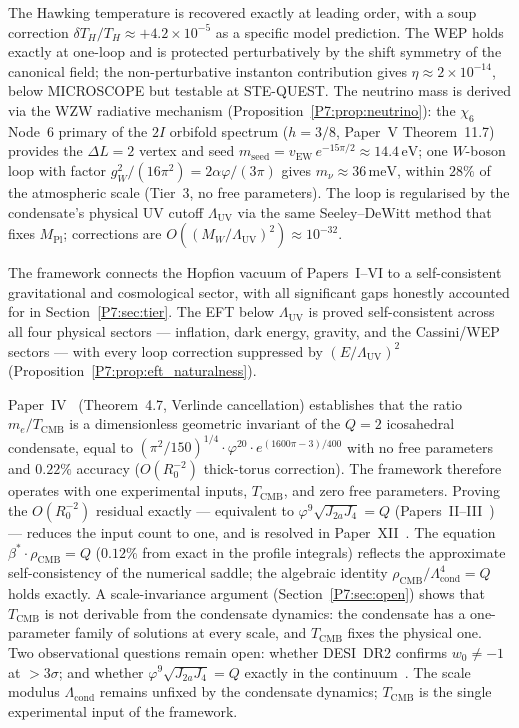 \documentclass[11pt,a4paper]{article}
\theoremstyle{definition}
\theoremstyle{remark}
\newcommand{\vp}{\varphi}
\newcommand{\bst}{\beta^{*}}
\newcommand{\TCMB}{T_{\mathrm{CMB}}}
\newcommand{\rCMB}{\rho_{\mathrm{CMB}}}
\newcommand{\Lcond}{\Lambda_{\mathrm{cond}}}
\newcommand{\vEW}{v_{\mathrm{EW}}}
\newcommand{\MPl}{M_{\mathrm{Pl}}}
\newcommand{\LUV}{\Lambda_{\mathrm{UV}}}
\newcommand{\Ja}{J_{2a}}
\newcommand{\Jfour}{J_{4}}
\begin{document}
The Hawking temperature is recovered exactly at leading order, with
a soup correction $\delta T_H/T_H\approx+4.2\times10^{-5}$ as a
specific model prediction.  The WEP holds exactly at one-loop and is
protected perturbatively by the shift symmetry of the canonical field;
the non-perturbative instanton contribution gives $\eta\approx2\times10^{-14}$,
below MICROSCOPE but testable at STE-QUEST.
The neutrino mass is derived via the WZW radiative mechanism
(Proposition~\ref{P7:prop:neutrino}): the $\chi_6$ Node~6 primary
of the $2I$ orbifold spectrum ($h=3/8$, Paper~V Theorem~11.7)
provides the $\Delta L=2$ vertex and seed
$m_\mathrm{seed}=\vEW\,e^{-15\pi/2}\approx14.4\,\mathrm{eV}$;
one $W$-boson loop with factor $g_W^2/(16\pi^2)=2\alpha\vp/(3\pi)$
gives $m_\nu\approx36\,\mathrm{meV}$, within $28\%$ of the atmospheric
scale (Tier~3, no free parameters).
The loop is regularised by the condensate's physical UV cutoff $\LUV$
via the same Seeley--DeWitt method that fixes $\MPl$; corrections
are $O((M_W/\LUV)^2)\approx10^{-32}$.

The framework connects the Hopfion vacuum of Papers~I--VI to a
self-consistent gravitational and cosmological sector, with all
significant gaps honestly accounted for in Section~\ref{P7:sec:tier}.
The EFT below $\LUV$ is proved self-consistent across all four physical
sectors --- inflation, dark energy, gravity, and the Cassini/WEP
sectors --- with every loop correction suppressed by $(E/\LUV)^2$
(Proposition~\ref{P7:prop:eft_naturalness}).

Paper~IV~\cite{Paper4} (Theorem~4.7, Verlinde cancellation) establishes
that the ratio $m_e/\TCMB$ is a dimensionless geometric invariant of the
$Q=2$ icosahedral condensate, equal to
$(\pi^2/150)^{1/4}\cdot\vp^{20}\cdot e^{(1600\pi-3)/400}$
with no free parameters and $0.22\%$ accuracy ($O(R_0^{-2})$ thick-torus correction).
The framework therefore operates with one experimental inputs,
$\TCMB$, and zero free parameters.
Proving the $O(R_0^{-2})$ residual exactly --- equivalent to
$\vp^9\sqrt{\Ja\Jfour}=Q$ (Papers~II--III~\cite{Paper2,Paper3}) --- reduces the input count to one, and is resolved in Paper~XII~\cite{Paper12}.
The equation $\bst\cdot\rCMB = Q$ ($0.12\%$ from exact in the profile
integrals) reflects the approximate self-consistency of the numerical
saddle; the algebraic identity $\rCMB/\Lcond^4 = Q$ holds exactly.
A scale-invariance argument (Section~\ref{P7:sec:open}) shows that $\TCMB$
is not derivable from the condensate dynamics: the condensate has a
one-parameter family of solutions at every scale, and $\TCMB$ fixes
the physical one.
Two observational questions remain open: whether DESI~DR2 confirms
$w_0\neq-1$ at $>3\sigma$; and whether $\vp^9\sqrt{\Ja\Jfour}=Q$ exactly
in the continuum~\cite{Paper2,Paper3}.
The scale modulus $\Lcond$ remains unfixed by the condensate dynamics;
$\TCMB$ is the single experimental input of the framework.
\end{document}
